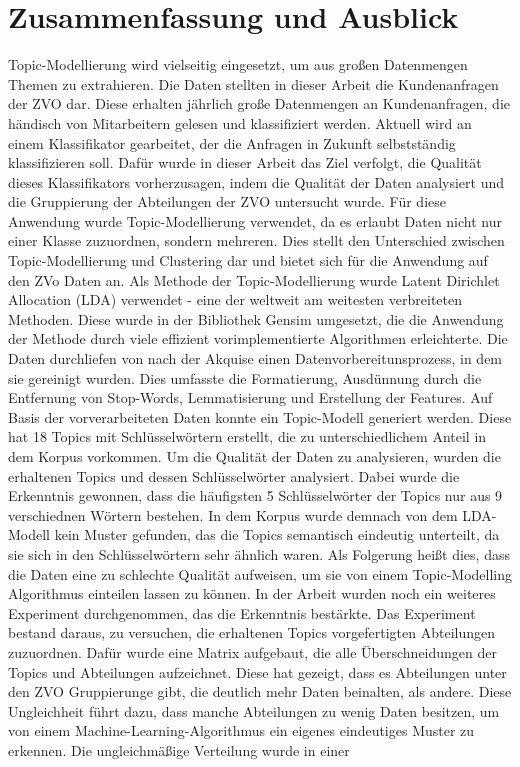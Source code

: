\documentclass[german,version-2020-11]{uzl-thesis}
\begin{document}
\chapter{Zusammenfassung und Ausblick}%

Topic-Modellierung wird vielseitig eingesetzt, um aus großen Datenmengen Themen zu extrahieren. Die Daten stellten in dieser Arbeit die Kundenanfragen der ZVO dar. Diese erhalten jährlich große Datenmengen an Kundenanfragen, die händisch von Mitarbeitern gelesen und klassifiziert werden. Aktuell wird an einem Klassifikator gearbeitet, der die Anfragen in Zukunft selbstständig klassifizieren soll. Dafür wurde in dieser Arbeit das Ziel verfolgt, die Qualität dieses Klassifikators vorherzusagen, indem die Qualität der Daten analysiert und die Gruppierung der Abteilungen der ZVO untersucht wurde. Für diese Anwendung wurde Topic-Modellierung verwendet, da es erlaubt Daten nicht nur einer Klasse zuzuordnen, sondern mehreren. Dies stellt den Unterschied zwischen Topic-Modellierung und Clustering dar und bietet sich für die Anwendung auf den ZVo Daten an. Als Methode der Topic-Modellierung wurde Latent Dirichlet Allocation (LDA) verwendet - eine der weltweit am weitesten verbreiteten Methoden. Diese wurde in der Bibliothek Gensim umgesetzt, die die Anwendung der Methode durch viele effizient vorimplementierte Algorithmen erleichterte. Die Daten durchliefen von nach der Akquise einen Datenvorbereitunsprozess, in dem sie gereinigt wurden. Dies umfasste die Formatierung, Ausdünnung durch die Entfernung von Stop-Words, Lemmatisierung und Erstellung der Features. Auf Basis der vorverarbeiteten Daten konnte ein Topic-Modell generiert werden. Diese hat 18 Topics mit Schlüsselwörtern erstellt, die zu unterschiedlichem Anteil in dem Korpus vorkommen. Um die Qualität der Daten zu analysieren, wurden die erhaltenen Topics und dessen Schlüsselwörter analysiert. Dabei wurde die Erkenntnis gewonnen, dass die häufigsten 5 Schlüsselwörter der Topics nur aus 9 verschiednen Wörtern bestehen. In dem Korpus wurde demnach von dem LDA-Modell kein Muster gefunden, das die Topics semantisch eindeutig unterteilt, da sie sich in den Schlüsselwörtern sehr ähnlich waren. Als Folgerung heißt dies, dass die Daten eine zu schlechte Qualität aufweisen, um sie von einem Topic-Modelling Algorithmus einteilen lassen zu können. In der Arbeit wurden noch ein weiteres Experiment durchgenommen, das die Erkenntnis bestärkte. Das Experiment bestand daraus, zu versuchen, die erhaltenen Topics vorgefertigten Abteilungen zuzuordnen. Dafür wurde eine Matrix aufgebaut, die alle Überschneidungen der Topics und Abteilungen aufzeichnet. Diese hat gezeigt, dass es Abteilungen unter den ZVO Gruppierunge gibt, die deutlich mehr Daten beinalten, als  andere. Diese Ungleichheit führt dazu, dass manche Abteilungen zu wenig Daten besitzen, um von einem Machine-Learning-Algorithmus ein eigenes eindeutiges Muster zu erkennen. Die ungleichmäßige Verteilung wurde in einer 
\end{document}
